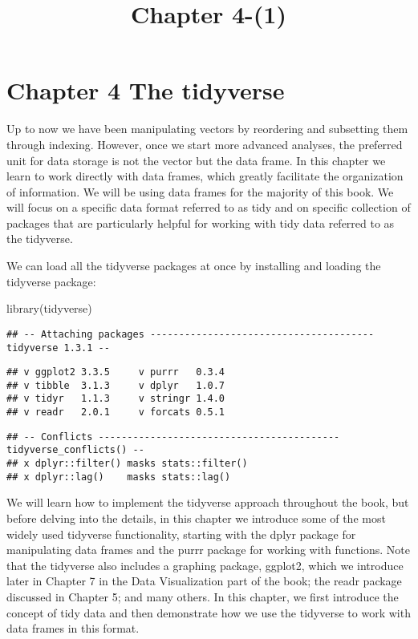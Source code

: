 \documentclass[
]{article}
\title{Chapter 4-(1)}
\author{}
\date{\vspace{-2.5em}}
\newenvironment{Shaded}{\begin{snugshade}}{\end{snugshade}}
\newcommand{\FunctionTok}[1]{\textcolor[rgb]{0.00,0.00,0.00}{#1}}
\newcommand{\NormalTok}[1]{#1}
\begin{document}
\maketitle

\hypertarget{chapter-4-the-tidyverse}{%
\section{Chapter 4 The tidyverse}\label{chapter-4-the-tidyverse}}

Up to now we have been manipulating vectors by reordering and subsetting
them through indexing. However, once we start more advanced analyses,
the preferred unit for data storage is not the vector but the data
frame. In this chapter we learn to work directly with data frames, which
greatly facilitate the organization of information. We will be using
data frames for the majority of this book. We will focus on a specific
data format referred to as tidy and on specific collection of packages
that are particularly helpful for working with tidy data referred to as
the tidyverse.

We can load all the tidyverse packages at once by installing and loading
the tidyverse package:

\begin{Shaded}
\begin{Highlighting}[]
\FunctionTok{library}\NormalTok{(tidyverse)}
\end{Highlighting}
\end{Shaded}

\begin{verbatim}
## -- Attaching packages --------------------------------------- tidyverse 1.3.1 --
\end{verbatim}

\begin{verbatim}
## v ggplot2 3.3.5     v purrr   0.3.4
## v tibble  3.1.3     v dplyr   1.0.7
## v tidyr   1.1.3     v stringr 1.4.0
## v readr   2.0.1     v forcats 0.5.1
\end{verbatim}

\begin{verbatim}
## -- Conflicts ------------------------------------------ tidyverse_conflicts() --
## x dplyr::filter() masks stats::filter()
## x dplyr::lag()    masks stats::lag()
\end{verbatim}

We will learn how to implement the tidyverse approach throughout the
book, but before delving into the details, in this chapter we introduce
some of the most widely used tidyverse functionality, starting with the
dplyr package for manipulating data frames and the purrr package for
working with functions. Note that the tidyverse also includes a graphing
package, ggplot2, which we introduce later in Chapter 7 in the Data
Visualization part of the book; the readr package discussed in Chapter
5; and many others. In this chapter, we first introduce the concept of
tidy data and then demonstrate how we use the tidyverse to work with
data frames in this format.
\end{document}
